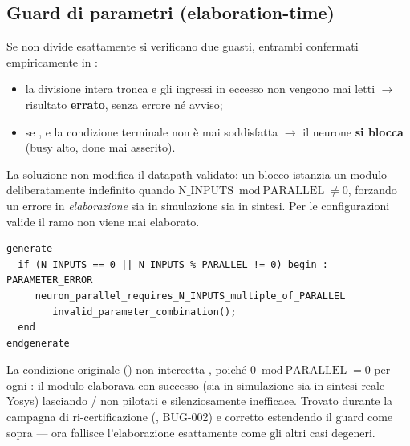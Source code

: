 \begin{center}
\end{center}

\subsection{Guard di parametri (elaboration-time)}
Se  non divide esattamente  si verificano due guasti,
entrambi confermati empiricamente in :
\begin{itemize}
\item la divisione intera tronca  e gli ingressi in eccesso non vengono
mai letti $\to$ risultato \textbf{errato}, senza errore né avviso;
\item se ,  e la condizione terminale non è mai
soddisfatta $\to$ il neurone \textbf{si blocca} (busy alto, done mai asserito).
\end{itemize}
La soluzione non modifica il datapath validato: un blocco  istanzia un
modulo deliberatamente indefinito quando $\text{N\_INPUTS} \bmod \text{PARALLEL}\neq0$,
forzando un errore in \emph{elaborazione} sia in simulazione sia in sintesi. Per le
configurazioni valide il ramo non viene mai elaborato.

\begin{lstlisting}[caption={\texttt{rtl/neuron\_parallel.v} --- guard di parametri}]
generate
  if (N_INPUTS == 0 || N_INPUTS % PARALLEL != 0) begin : PARAMETER_ERROR
     neuron_parallel_requires_N_INPUTS_multiple_of_PARALLEL
        invalid_parameter_combination();
  end
endgenerate
\end{lstlisting}

\begin{fnnote}[Caso limite \texttt{N\_INPUTS=0} (corretto 2026-09-04)]
La condizione originale () non intercetta
, poiché $0 \bmod \text{PARALLEL}=0$ per ogni : il modulo
elaborava con successo (sia in simulazione sia in sintesi reale Yosys) lasciando
/ non pilotati e  silenziosamente inefficace. Trovato
durante la campagna di ri-certificazione (, BUG-002) e
corretto estendendo il guard come sopra ---  ora fallisce l'elaborazione
esattamente come gli altri casi degeneri.
\end{fnnote}

